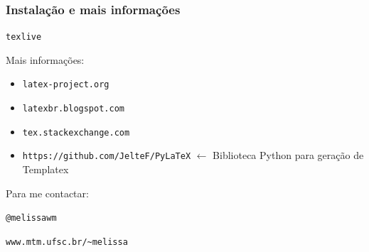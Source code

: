 \documentclass{beamer}
\begin{document}
\begin{frame}[fragile]
   \frametitle{Instalação e mais informações}
   \begin{center}
      \verb+texlive+
   \end{center}
   Mais informações:
   \begin{itemize}
      \item \verb+latex-project.org+
      \item \verb+latexbr.blogspot.com+
      \item \verb+tex.stackexchange.com+
      \item \verb+https://github.com/JelteF/PyLaTeX+ $\leftarrow$ Biblioteca Python para geração de Templatex
   \end{itemize}
   Para me contactar:
   \begin{center}
   \verb+@melissawm+
          
   \verb+www.mtm.ufsc.br/~melissa+
   \end{center}
\end{frame}
\end{document}
